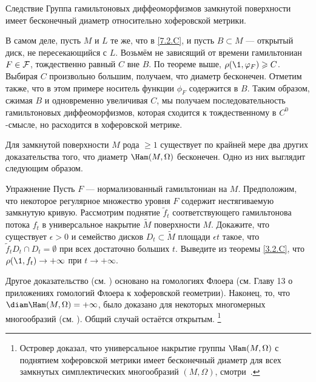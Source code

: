 \begin{thm}{Следствие}\label{7.2.D} Группа гамильтоновых диффеоморфизмов замкнутой поверхности имеет бесконечный диаметр относительно хоферовской метрики.
\end{thm}

В самом деле, пусть $M$ и $L$ те же, что в \ref{7.2.C}, и пусть $B \subset M$ — открытый диск, не пересекающийся с $L$.
Возьмём не зависящий от времени гамильтониан $F \in \mathcal{F}$, тождественно равный $C$ вне $B$.
По теореме выше, $\rho (\1, \phi_F) \ge C$.
Выбирая $C$ произвольно большим, получаем, что диаметр бесконечен.
Отметим также, что в этом примере носитель функции $\phi_F$ содержится в $B$.
Таким образом, сжимая $B$ и одновременно увеличивая $C$, мы получаем
последовательность гамильтоновых диффеоморфизмов, которая сходится к
тождественному в $C^0$-смысле, но расходится в хоферовской метрике. 

Для замкнутой поверхности $M$ рода $\ge 1$ существует по крайней мере
два других доказательства того, что диаметр $\Ham (M, \Omega)$
бесконечен. 
Одно из них выглядит следующим образом. 

\begin{ex}[(см. \cite{LM2}).]{Упражнение} \label{7.2.E}
Пусть $F$ — нормализованный гамильтониан на $M$.
Предположим, что некоторое регулярное множество уровня $F$ содержит
нестягиваемую замкнутую кривую.  
Рассмотрим поднятие $\tilde f_t$ соответствующего гамильтонова потока
$f_t$ в универсальное накрытие $\tilde M$ поверхности $M$.  
Докажите, что существует $\epsilon> 0$ и семейство дисков $D_t \subset
\tilde M$ площади $\epsilon t$ такое, что $\tilde f_t D_t \cap D_t =
\emptyset$ при всех достаточно больших $t$.  
Выведите из теоремы \ref{3.2.C}, что $\rho (\1, f_t) \to + \infty$ при $t \to + \infty$.  
\end{ex}

Другое доказательство (см. \cite{Sch3}) основано на
гомологиях Флоера (см. Главу 13 о приложениях гомологий Флоера к
хоферовской геометрии).
Наконец, то, что $\diam \Ham (M, \Omega) = + \infty$, было доказано
для некоторых многомерных многообразий
(см. \cite{LM2,Sch3,P5}).
Общий случай остаётся открытым.%
\footnote{
Островер доказал, что универсальное накрытие группы $\Ham(M,\Omega)$ с
поднятием хоферовской метрики имеет бесконечный диаметр для всех
замкнутых симплектических многообразий $(M,\Omega)$, смотри~\cite{O03,McD09}.\dpp}

